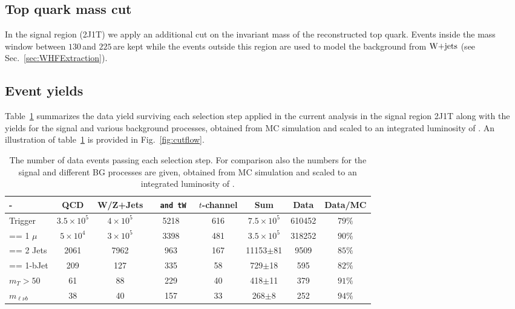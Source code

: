           
                
\subsection{Top quark mass cut}

In the signal region (2J1T) we apply an additional cut on the invariant mass of the reconstructed top quark. Events inside the mass window between $130\,$\GeV and $225\,$\GeV are kept while the events outside this region are used to model the background from $\textrm{W+jets}$ (see Sec.~\ref{sec:WHFExtraction}).


\subsection{Event yields}
                
Table~\ref{tab:yields} summarizes the data yield surviving each selection step applied in the current analysis in the signal region 2J1T along with the yields for the signal and various background processes, obtained from MC simulation and scaled to an integrated luminosity of \mylumi. An illustration of table~\ref{tab:yields} is provided in Fig.~\ref{fig:cutflow}.            

\begin{table}[H!] 
 \caption{The number of data events passing each selection step. For comparison also the numbers for the signal and different BG processes are given, obtained from MC simulation and scaled to an integrated luminosity of \mylumi.}
  \label{tab:yields}
 \begin{center}
\begin{tabular}{l|c|c|c|c|c|c|c}
- & QCD & W/Z+Jets &\tt~ and tW & $t$-channel & Sum & Data & Data/MC\\
\hline
Trigger & $3.5\times10^5$ & $4\times10^5$ & 5218 & 616 & $7.5\times10^5$ & 610452 & $79\%$\\
== 1 $\mu$ & $5\times10^4$ & $3\times10^5$ & 3398 & 481 & $3.5\times10^5$ & 318252 & $90\%$\\
== 2 Jets & 2061 & 7962 & 963 & 167 & 11153$\pm$81 & 9509 & $85\%$\\
== 1-bJet & 209 & 127 & 335 & 58 & 729$\pm$18 & 595 & $82\%$\\
$m_T > 50$ & 61 & 88 & 229 & 40 & 418$\pm$11 & 379 & $91\%$\\
$m_{\ell\nu b}$ & 38 & 40 & 157 & 33 & 268$\pm$8 & 252 & $94\%$\\
\end{tabular}
\end{center}
\end{table}


